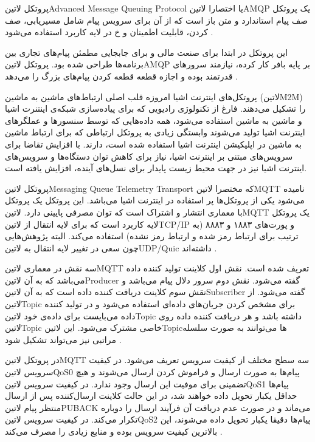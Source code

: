 
پروتکل ‌لاتین{Advanced Message Queuing Protocol} یا اختصارا ‌لاتین{AMQP} یک پروتکل صف پیام استاندارد و متن باز است
که از آن برای سرویس پیام شامل مسیریابی، صف کردن، قابلیت اطمینان و ‌خ در لایه کاربرد استفاده می‌شود
.

این پروتکل در ابتدا برای صنعت مالی و برای جابجایی مطمئن پیام‌های تجاری بین برنامه‌ها طراحی شده بود.
پروتکل ‌لاتین{AMQP} بر پایه بافر کار کرده، نیازمند سرورهای قدرتمند بوده و اجازه قطعه قطعه کردن پیام‌های بزرگ را می‌دهد
.


پروتکل‌های اینترنت اشیا امروزه قلب اصلی ارتباط‌های ماشین به ماشین (‌لاتین{M2M}) را تشکیل می‌دهند. فارغ از تکنولوژی رادیویی که برای پیاده‌سازی شبکه‌ی اینتنرت اشیا و ماشین به ماشین استفاده می‌شود، همه داده‌هایی که توسط سنسورها و عملگرهای اینترنت اشیا
تولید می‌شوند وابستگی زیادی به پروتکل ارتباطی که برای ارتباط ماشین به ماشین در اپلیکیشن اینترنت اشیا استفاده شده است، دارند.
با افزایش تقاضا برای سرویس‌های مبتنی بر اینترنت اشیا، نیاز برای کاهش توان دستگاه‌ها و سرویس‌های اینترنت اشیا نیز در جهت محیط زیست پایدار برای نسل‌های آینده، افزایش یافته است.

پروتکل ‌لاتین{Messaging Queue Telemetry Transport} که مختصرا ‌لاتین{MQTT} نامیده می‌شود یکی از پروتکل‌ها پر استفاده در اینترنت اشیا می‌باشد.
این پروتکل یک پروتکل با معماری انتشار و اشتراک است که توان مصرفی پایینی دارد.
‌لاتین{MQTT} یک پروتکل لایه کاربرد است که برای لایه انتقال از ‌لاتین{TCP/IP} و پورت‌های ۱۸۸۳ و ۸۸۸۳ (به ترتیب برای ارتباط رمز شده و ارتباط رمز نشده) استفاده می‌کند. البته پژوهش‌هایی چون  سعی در تغییر لایه انتقال به ‌لاتین{UDP/Quic} داشته‌اند
.

سه نقش در معماری ‌لاتین{MQTT} تعریف شده است. نقش اول کلاینت تولید کننده داده می‌باشد که به آن ‌لاتین{Producer} گفته می‌شود. نقش دوم سرور دلال پیام می‌باشد و نقش سوم کلاینت دریافت کننده داده است که به آن ‌لاتین{Subscriber} گفته می‌شود.
از ‌لاتین{Topic} برای مشخص کردن جریان‌های داده‌ای استفاده می‌شود و در تولید کننده داده می‌بایست برای داده‌ی خود ‌لاتین{Topic} داشته باشد و هر دریافت کننده داده روی ‌لاتین{Topic} خاصی مشترک می‌شود.
این ‌لاتین{Topic}ها می‌توانند به صورت سلسله مراتبی نیز می‌تواند تشکیل شود
.

در پروتکل ‌لاتین{‌MQTT} سه سطح مختلف از کیفیت سرویس تعریف می‌شود. در کیفیت سرویس ‌لاتین{QoS0} پیام‌ها به صورت ارسال و فراموش کردن ارسال می‌شوند و هیچ تضمینی برای موفیت این ارسال وجود ندارد.
در کیفیت سرویس ‌لاتین{QoS1} پیام‌ها حداقل یکبار تحویل داده خواهند شد، در این حالت کلاینت ارسال‌کننده پس از ارسال منتظر پیام ‌لاتین{PUBACK} می‌ماند و در صورت عدم دریافت آن فرآیند ارسال را دوباره تکرار می‌کند.
در کیفیت سرویس ‌لاتین{QoS2} پیام‌ها دقیقا یکبار تحویل داده می‌شوند، این بالاترین کیفیت سرویس بوده و منابع زیادی را مصرف می‌کند
.

